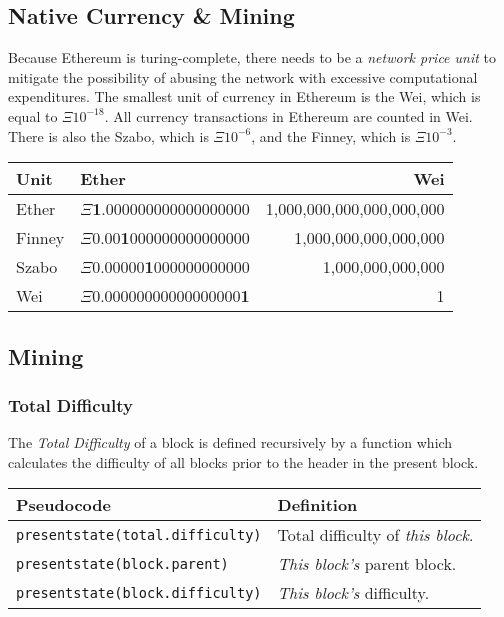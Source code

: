 \documentclass[10pt,a4paper,leqno,bibliography=totoc]{scrartcl}
\makeatletter
\let\mcnewpage=\newpage
\newcommand{\TrickSupertabularIntoMulticols}{%
\renewcommand\newpage{%
	      \if@firstcolumn
	            \hrule width\linewidth height0pt
          \columnbreak
      \else
        \mcnewpage
       \fi
  }%
 }
\newenvironment{alphafootnotes}
{\par\edef\savedfootnotenumber{\number\value{footnote}}
\renewcommand{\thefootnote}{\alph{footnote}}
\setcounter{footnote}{0}}
{\par\setcounter{footnote}{\savedfootnotenumber}}
\makeatother
\begin{document}
\begin{alphafootnotes}
	\clearpage

	\tableofcontents

	\clearpage

	\begin{multicols*}{2}
	\TrickSupertabularIntoMulticols
	\justify	

	\section{Native Currency \& Mining}
		Because Ethereum is turing-complete, there needs to be a \textsl{network price  unit} to mitigate the possibility of abusing the network with excessive computational expenditures. The smallest unit of currency in Ethereum is the Wei, which is equal to $\Xi10^{-18}$. All currency transactions in Ethereum are counted in Wei. There  is also the Szabo, which is $\Xi10^{-6}$,  and the Finney, which is $\Xi10^{-3}$. \\ 
		\begin{tabular}{llr}
			\toprule
			\textbf{Unit} & \textbf{Ether} & \textbf{Wei} \\
			\midrule
			\scriptsize{Ether} & \scriptsize{$\Xi$\textbf{1}.000000000000000000} & \scriptsize{1,000,000,000,000,000,000} \\
			\scriptsize{Finney} & \scriptsize{$\Xi$0.00\textbf{1}000000000000000} & \scriptsize{1,000,000,000,000,000} \\
			\scriptsize{Szabo} & \scriptsize{$\Xi$0.00000\textbf{1}000000000000} & \scriptsize{1,000,000,000,000} \\
			\scriptsize{Wei} & \scriptsize{$\Xi$0.00000000000000000\textbf{1}} & \scriptsize{1} \\
			\bottomrule
		\end{tabular}
		\subsection{Mining}
			\subsubsection{Total Difficulty}
				The \textit{Total Difficulty} of a block is defined recursively by a function which calculates the difficulty of all blocks prior to the header in the present block. 
	\flushleft			
   \begin{tabular}{ll}
	   \toprule
	   \textbf{Pseudocode} & \textbf{Definition} \\
	   \midrule
	   \texttt{\scriptsize{presentstate(total.difficulty)}} & \scriptsize{Total difficulty of \textsl{this block}.} \\
	   \texttt{\scriptsize{presentstate(block.parent)}}     & \scriptsize{\textsl{This block's} parent block.} \\
	   \texttt{\scriptsize{presentstate(block.difficulty)}} & \scriptsize{\textsl{This block's} difficulty.} \\
	   \bottomrule
   \end{tabular}
	\justify


\end{multicols*}
\end{alphafootnotes}
\end{document}
